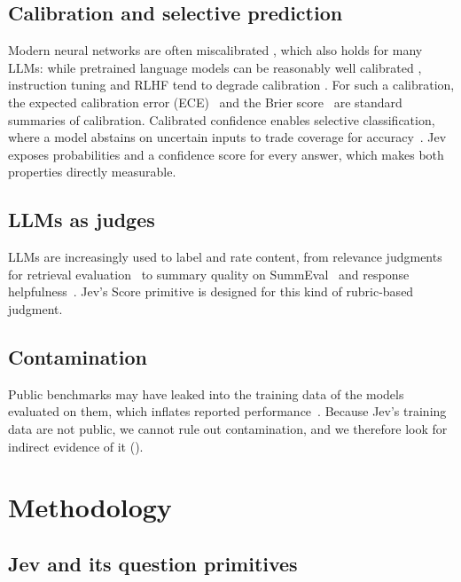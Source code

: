 \documentclass[table]{article}
\begin{document}
\subsection{Calibration and selective prediction}
Modern neural networks are often miscalibrated \cite{guo2017calibration}, which also holds for many LLMs: while pretrained language models can be reasonably well calibrated \cite{kadavath2022languagemodelsmostlyknow}, instruction tuning and RLHF tend to degrade calibration \cite{openai2024gpt4technicalreport,tian-etal-2023-just}.
For such a calibration, the expected calibration error (ECE)~\cite{naeini2015obtaining} and the Brier score~\cite{glenn1950verification} are standard summaries of calibration. Calibrated confidence enables selective classification, where a model abstains on uncertain inputs to trade coverage for accuracy~\cite{geifman2017selective}. Jev exposes probabilities and a confidence score for every answer, which makes both properties directly measurable.

\subsection{LLMs as judges}
LLMs are increasingly used to label and rate content, from relevance judgments for retrieval evaluation~\cite{faggioli2023perspectives,thomas2024preferences} to summary quality on SummEval~\cite{fabbri2021summeval,liu-etal-2023-g} and response helpfulness~\cite{wang2024helpsteer2}. Jev's Score primitive is designed for this kind of rubric-based judgment.

\subsection{Contamination}
Public benchmarks may have leaked into the training data of the models evaluated on them, which inflates reported performance~\cite{sainz-etal-2023-nlp}. Because Jev's training data are not public, we cannot rule out contamination, and we therefore look for indirect evidence of it ().


\section{Methodology}

\subsection{Jev and its question primitives}
\end{document}
